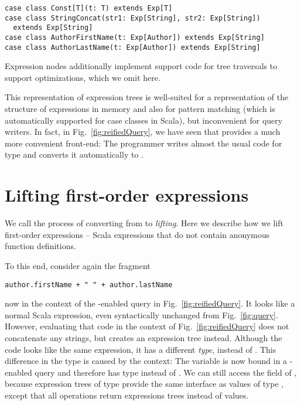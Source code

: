 \begin{lstlisting}
case class Const[T](t: T) extends Exp[T]
case class StringConcat(str1: Exp[String], str2: Exp[String])
  extends Exp[String]
case class AuthorFirstName(t: Exp[Author]) extends Exp[String]
case class AuthorLastName(t: Exp[Author]) extends Exp[String]
\end{lstlisting}

Expression nodes additionally implement support code for tree traversals to support optimizations, which we omit here.

This representation of expression trees is well-suited for a representation of the structure of expressions in memory and also for pattern matching (which is automatically supported for case classes in Scala), but inconvenient for query writers. In fact, in Fig.~\ref{fig:reifiedQuery}, we have seen that {\LoS} provides a much more convenient front-end: The programmer writes almost the usual code for type  and {\LoS} converts it automatically to .

\section{Lifting first-order expressions}

We call the process of converting from  to  \emph{lifting}. Here we describe how we lift first-order expressions -- Scala expressions that do
not contain anonymous function definitions.

To this end, consider again the fragment
\begin{lstlisting}
author.firstName + " " + author.lastName
\end{lstlisting}
now in the context of the {\LoS}-enabled query in Fig.~\ref{fig:reifiedQuery}. It looks like a normal Scala expression, even syntactically unchanged from Fig.~\ref{fig:query}. However, evaluating that code in the context of Fig.~\ref{fig:reifiedQuery} does not concatenate any strings, but creates an expression tree instead. Although the code looks like the same expression, it has a different \emph{type},  instead of . This difference in the type is caused by the context: The variable  is now bound in a {\LoS}-enabled query and therefore has type  instead of . We can still access the  field of , because expression trees of type  provide the same interface as values of type , except that all operations return expressions trees instead of values.

